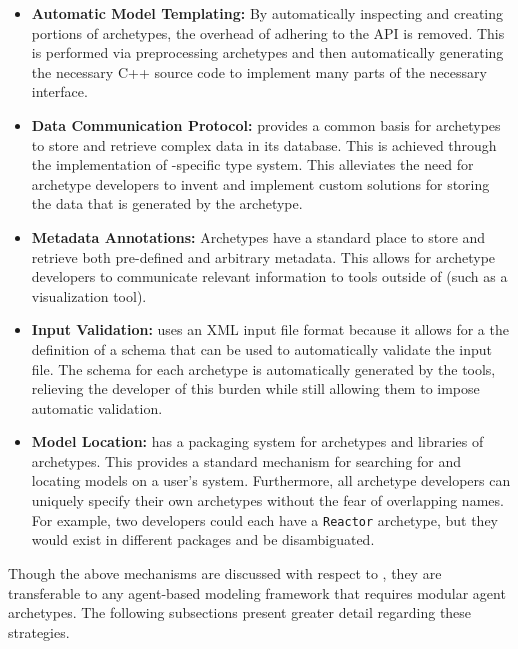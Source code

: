\begin{itemize}
\item \textbf{Automatic Model Templating:} By automatically inspecting and
  creating portions of archetypes, the overhead of adhering to the \Cyclus
  \gls{API} is removed. This is performed via preprocessing archetypes and
  then automatically generating the necessary C++ source code to implement
  many parts of the necessary interface.

\item \textbf{Data Communication Protocol:} \Cyclus provides a common basis
  for archetypes to store and retrieve complex data in its database. This is
  achieved through the implementation of \Cyclus-specific type system.  This
  alleviates the need for archetype developers to invent and implement custom
  solutions for storing the data that is generated by the archetype.

\item \textbf{Metadata Annotations:} Archetypes have a standard place to store
  and retrieve both pre-defined and arbitrary metadata.  This allows for
  archetype developers to communicate relevant information to tools outside of
  \Cyclus (such as a visualization tool).

\item \textbf{Input Validation:} \Cyclus uses an \gls{XML} input file format
  because it allows for a the definition of a schema that can be used to
  automatically validate the input file.  The schema for each archetype is
  automatically generated by the \Cyclus tools, relieving the developer of
  this burden while still allowing them to impose automatic validation.

\item \textbf{Model Location:} \Cyclus has a packaging system for archetypes
  and libraries of archetypes. This provides a standard mechanism for
  searching for and locating models on a user's system.  Furthermore, all
  archetype developers can uniquely specify their own archetypes without the
  fear of overlapping names.  For example, two developers could each have a
  \texttt{Reactor} archetype, but they would exist in different packages and
  be disambiguated.

\end{itemize}

Though the above mechanisms are discussed with respect to \Cyclus, they are
transferable to any agent-based modeling framework that requires modular agent
archetypes. The following subsections present greater detail regarding these
strategies.

